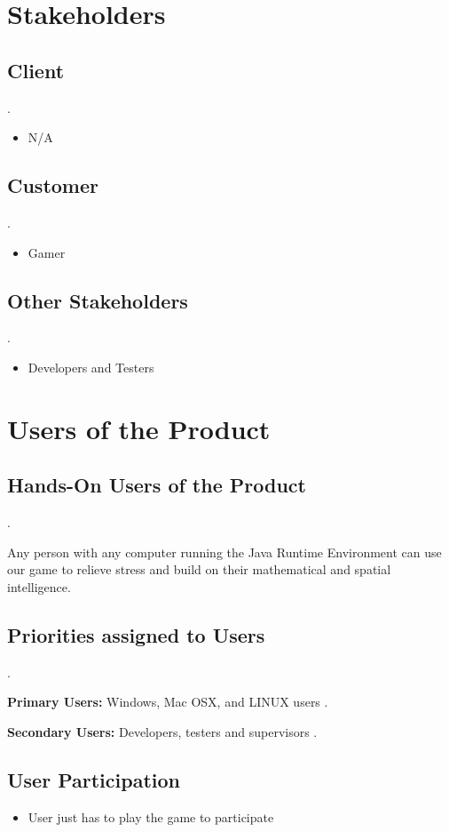 \documentclass[12pt]{amsart}
\begin{document}
\section{Stakeholders}
\subsection{Client}
.\par
\begin{itemize}
\item N/A
\end{itemize}
\subsection{Customer}
.\par
\begin{itemize}
\item Gamer
\end{itemize}
\subsection{Other Stakeholders}
.\par
\begin{itemize}
\item Developers and Testers
\end{itemize}

\section{Users of the Product}
\subsection{Hands-On Users of the Product}
.\par
Any person with any computer running the Java Runtime Environment can use our game to relieve stress and build on their mathematical and spatial intelligence. 
\subsection{Priorities assigned to Users}
.\par
\textbf{Primary Users:} Windows, Mac OSX, and LINUX users
.\par
\textbf{Secondary Users:} Developers, testers and supervisors
.\par
\subsection{User Participation}
\begin{itemize}
\item User just has to play the game to participate
\end{itemize}
\end{document}
